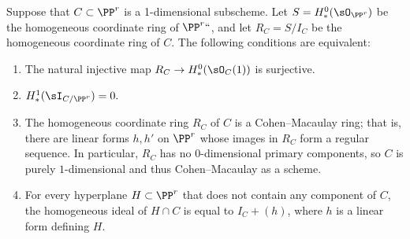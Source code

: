 \begin{proposition}\label{ACM basics}
Suppose that $C\subset \PP^r$ is a 1-dimensional subscheme. Let $S = H^0_*(\sO_{\PP^r})$
be the homogeneous coordinate ring of $\PP^r` `$, and let $R_C = S/I_C$ be the homogeneous
coordinate ring of $C$. The following conditions are equivalent:
\begin{enumerate}

 \item The natural injective map $R_C \to H^0_*(\sO_{C}(1))$ is surjective.
 
\item $H^1_*(\sI_{C/\PP^r}) = 0.$

\item The homogeneous coordinate ring $R_C$ of $C$ is a Cohen--Macaulay ring; that is, there are linear forms $h,h'$ on $\PP^r$ whose images in  $R_C$ form a regular sequence. In particular, $R_C$ has no $0$-dimensional primary components,
so $C$ is purely $1$-dimensional and thus Cohen--Macaulay as a scheme.
%

 \item For every hyperplane $H\subset \PP^r$ that does not contain any component of $C$,
 the homogeneous ideal of $H\cap C$
 is equal to  $I_C+(h)$, where $h$ is a linear form defining $H$.
\end{enumerate}
\end{proposition}

